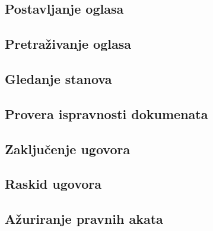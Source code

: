 \documentclass{article}
\begin{document}
\newpage
\subsection{\bfseries Postavljanje oglasa}

\newpage
\subsection{\bfseries Pretra\v{z}ivanje oglasa}

\newpage
\subsection{\bfseries Gledanje stanova}

\newpage
\subsection{\bfseries Provera ispravnosti dokumenata}

\newpage
\subsection{\bfseries Zaklju\v{c}enje ugovora}

\newpage
\subsection{\bfseries Raskid ugovora}

\newpage
\subsection{\bfseries A\v{z}uriranje pravnih akata}
\end{document}
